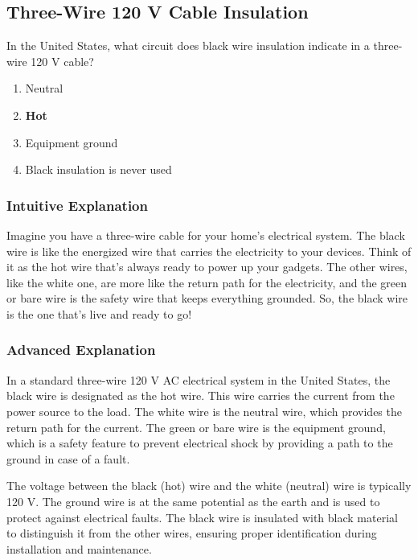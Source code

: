 \subsection{Three-Wire 120 V Cable Insulation}
\label{T0A03}

\begin{tcolorbox}[colback=gray!10!white,colframe=black!75!black,title=T0A03]
In the United States, what circuit does black wire insulation indicate in a three-wire 120 V cable?
\begin{enumerate}[label=\Alph*)]
    \item Neutral
    \item \textbf{Hot}
    \item Equipment ground
    \item Black insulation is never used
\end{enumerate}
\end{tcolorbox}

\subsubsection{Intuitive Explanation}
Imagine you have a three-wire cable for your home's electrical system. The black wire is like the energized wire that carries the electricity to your devices. Think of it as the hot wire that’s always ready to power up your gadgets. The other wires, like the white one, are more like the return path for the electricity, and the green or bare wire is the safety wire that keeps everything grounded. So, the black wire is the one that’s live and ready to go!

\subsubsection{Advanced Explanation}
In a standard three-wire 120 V AC electrical system in the United States, the black wire is designated as the hot wire. This wire carries the current from the power source to the load. The white wire is the neutral wire, which provides the return path for the current. The green or bare wire is the equipment ground, which is a safety feature to prevent electrical shock by providing a path to the ground in case of a fault.

The voltage between the black (hot) wire and the white (neutral) wire is typically 120 V. The ground wire is at the same potential as the earth and is used to protect against electrical faults. The black wire is insulated with black material to distinguish it from the other wires, ensuring proper identification during installation and maintenance.

